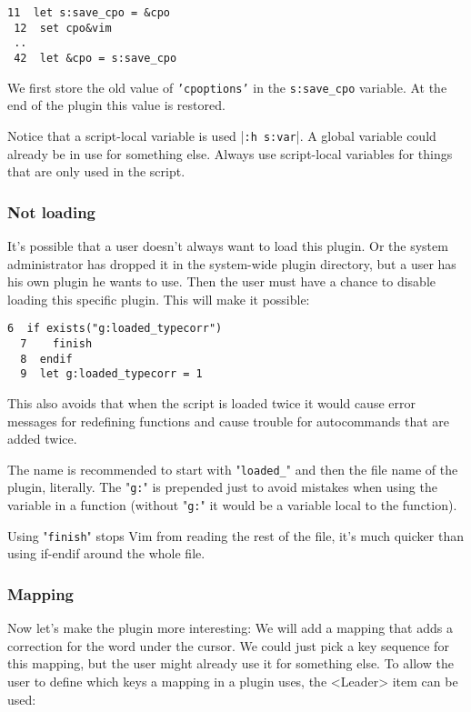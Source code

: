 \begin{Verbatim}[samepage=true]
 11  let s:save_cpo = &cpo
 12  set cpo&vim
 ..
 42  let &cpo = s:save_cpo
\end{Verbatim}

We first store the old value of \texttt{'cpoptions'} in the \texttt{s:save\_cpo} variable.
At the end of the plugin this value is restored.

Notice that a script-local variable is used |\texttt{:h s:var}|.
A global variable could already be in use for something else.
Always use script-local variables for things that are only used in the script.

\subsubsection{Not loading}
It's possible that a user doesn't always want to load this plugin.
Or the system administrator has dropped it in the system-wide plugin directory, but a user has his own plugin he wants to use.
Then the user must have a chance to disable loading this specific plugin.
This will make it possible:

\begin{Verbatim}[samepage=true]
  6  if exists("g:loaded_typecorr")
  7    finish
  8  endif
  9  let g:loaded_typecorr = 1
\end{Verbatim}

This also avoids that when the script is loaded twice it would cause error messages for redefining functions and cause trouble for autocommands that are added twice.

The name is recommended to start with "\texttt{loaded\_}" and then the file name of the plugin, literally.
The "\texttt{g:}" is prepended just to avoid mistakes when using the variable in a function (without "\texttt{g:}" it would be a variable local to the function).

Using "\texttt{finish}" stops Vim from reading the rest of the file, it's much quicker than using if-endif around the whole file.

\subsubsection{Mapping}
Now let's make the plugin more interesting: We will add a mapping that adds a correction for the word under the cursor.
We could just pick a key sequence for this mapping, but the user might already use it for something else.
To allow the user to define which keys a mapping in a plugin uses, the <Leader> item can be used:

